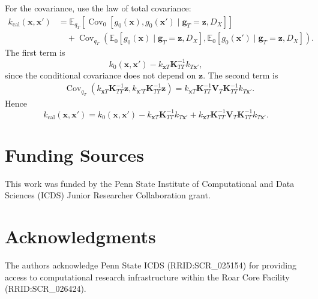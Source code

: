 \documentclass[journal]{new-aiaa}
\begin{document}
For the covariance, use the law of total covariance:
\[
\begin{aligned}
k_{\mathrm{cal}}(\mathbf{x},\mathbf{x}')
&=
\mathbb{E}_{q_T}
\left[
\operatorname{Cov}_0
\left[
g_0(\mathbf{x}),g_0(\mathbf{x}')
\mid
\mathbf{g}_T=\mathbf{z},D_X
\right]
\right] \\
&\quad+
\operatorname{Cov}_{q_T}
\left(
\mathbb{E}_0[g_0(\mathbf{x})\mid \mathbf{g}_T=\mathbf{z},D_X],
\mathbb{E}_0[g_0(\mathbf{x}')\mid \mathbf{g}_T=\mathbf{z},D_X]
\right).
\end{aligned}
\]
The first term is
\[
k_0(\mathbf{x},\mathbf{x}')
-
k_{\mathbf{x}T}\mathbf{K}_{TT}^{-1}k_{T\mathbf{x}'},
\]
since the conditional covariance does not depend on \(\mathbf{z}\). The second term is
\[
\begin{aligned}
&\operatorname{Cov}_{q_T}
\left(
k_{\mathbf{x}T}\mathbf{K}_{TT}^{-1}\mathbf{z},
k_{\mathbf{x}'T}\mathbf{K}_{TT}^{-1}\mathbf{z}
\right)  =
k_{\mathbf{x}T}
\mathbf{K}_{TT}^{-1}
\mathbf{V}_T
\mathbf{K}_{TT}^{-1}
k_{T\mathbf{x}'}.
\end{aligned}
\]
Hence
\[
\boxed{
k_{\mathrm{cal}}(\mathbf{x},\mathbf{x}')
=
k_0(\mathbf{x},\mathbf{x}')
-
k_{\mathbf{x}T}\mathbf{K}_{TT}^{-1}k_{T\mathbf{x}'}
+
k_{\mathbf{x}T}
\mathbf{K}_{TT}^{-1}
\mathbf{V}_T
\mathbf{K}_{TT}^{-1}
k_{T\mathbf{x}'}
}.
\]

\section*{Funding Sources}
This work was funded by the Penn State Institute of Computational and Data Sciences (ICDS) Junior Researcher Collaboration grant.

\section*{Acknowledgments}
The authors acknowledge Penn State ICDS (RRID:SCR\_025154) for providing access to computational research infrastructure within the Roar Core Facility (RRID:SCR\_026424).


\end{document}
